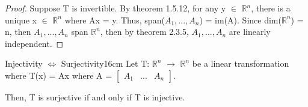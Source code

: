     \begin{proof}
        Suppose T is invertible.
        By {\color{red} theorem 1.5.12}, for any y $\in$ $\mathbb{R}^n$,
        there is a unique x $\in$ $\mathbb{R}^n$ where
        Ax = y. Thus, span($A_1,...,A_n$) = im(A).
        Since dim($\mathbb{R}^n$) = n, then $A_1,...,A_n$ span $\mathbb{R}^n$,
        then by {\color{red} theorem 2.3.5},
        $A_1,...,A_n$ are linearly independent.
    \end{proof}

    \newpage



    \begin{wtheorem}{Injectivity $\Leftrightarrow$ Surjectivity}{16cm}
        Let T: $\mathbb{R}^n$ $\rightarrow$ $\mathbb{R}^n$
        be a linear transformation where T(x) = Ax
        where A =
        $\begin{bmatrix}
            A_1 & ... & A_n
        \end{bmatrix}$.

        Then, T is surjective if and only if T is injective.
    \end{wtheorem}

